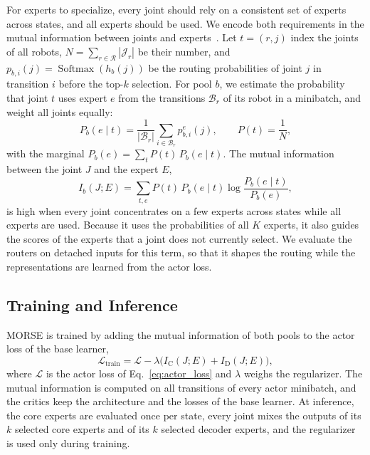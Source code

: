 For experts to specialize, every joint should rely on a consistent set of experts across states, and all experts
should be used. We encode both requirements in the mutual information between joints and
experts~\citep{chen2023modsquad}. Let $t=(r,j)$ index the joints of all robots, $N=\sum_{r\in\mathcal{R}}
|\mathcal{J}_r|$ be their number, and $p_{b,i}(j)=\operatorname{Softmax}(h_b(j))$ be the routing probabilities of
joint $j$ in transition $i$ before the top-$k$ selection. For pool $b$, we estimate the probability that joint $t$
uses expert $e$ from the transitions $\mathcal{B}_r$ of its robot in a minibatch, and weight all joints equally:
\begin{equation}
P_b(e\mid t)=\frac{1}{|\mathcal{B}_r|}\sum_{i\in\mathcal{B}_r}p^e_{b,i}(j),\qquad P(t)=\frac{1}{N},
\label{eq:routing_marginals}
\end{equation}
with the marginal $P_b(e)=\sum_tP(t)\,P_b(e\mid t)$. The mutual information between the joint $J$ and the expert $E$,
\begin{equation}
I_b(J;E)=\sum_{t,e}P(t)\,P_b(e\mid t)\log\frac{P_b(e\mid t)}{P_b(e)},
\label{eq:mi}
\end{equation}
is high when every joint concentrates on a few experts across states while all experts are used. Because it uses the
probabilities of all $K$ experts, it also guides the scores of the experts that a joint does not currently select. We
evaluate the routers on detached inputs for this term, so that it shapes the routing while the representations are
learned from the actor loss.

\subsection{Training and Inference}
\label{sec:training}

MORSE is trained by adding the mutual information of both pools to the actor loss of the base learner,
\begin{equation}
\mathcal{L}_{\mathrm{train}}=\mathcal{L}-\lambda\bigl(I_{\mathrm{C}}(J;E)+I_{\mathrm{D}}(J;E)\bigr),
\label{eq:train}
\end{equation}
where $\mathcal{L}$ is the actor loss of Eq.~\eqref{eq:actor_loss} and $\lambda$ weighs the regularizer. The
mutual information is computed on all transitions of every actor minibatch, and the critics keep the architecture
and the losses of the base learner. At inference, the core experts are evaluated once per state, every joint mixes
the outputs of its $k$ selected core experts and of its $k$ selected decoder experts, and the regularizer is used
only during training.

